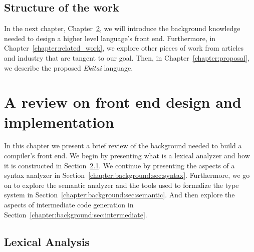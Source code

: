 \documentclass[
    oneside,
    english,
    embeddedlogo,
    noabntexcite
]{ufsc-thesis-rn46-2019}
\begin{document}
\section{Structure of the work}

In the next chapter, Chapter~\ref{chapter:background}, we will introduce the background knowledge needed to design a higher level language's front end. Furthermore, in Chapter~\ref{chapter:related_work}, we explore other pieces of work from articles and industry that are tangent to our goal. Then, in Chapter~\ref{chapter:proposal}, we describe the proposed \textit{Ekitai} language.

\chapter{A review on front end design and implementation}\label{chapter:background}

In this chapter we present a brief review of the background needed to build a compiler's front end.
We begin by presenting what is a lexical analyzer and how it is constructed in Section~\ref{chapter:background:sec:lexical}.
We continue by presenting the aspects of a syntax analyzer in Section~\ref{chapter:background:sec:syntax}.
Furthermore, we go on to explore the semantic analyzer and the tools used to formalize the type system in Section~\ref{chapter:background:sec:semantic}.
And then explore the aspects of intermediate code generation in Section~\ref{chapter:background:sec:intermediate}.

\section{Lexical Analysis}\label{chapter:background:sec:lexical}
\end{document}
